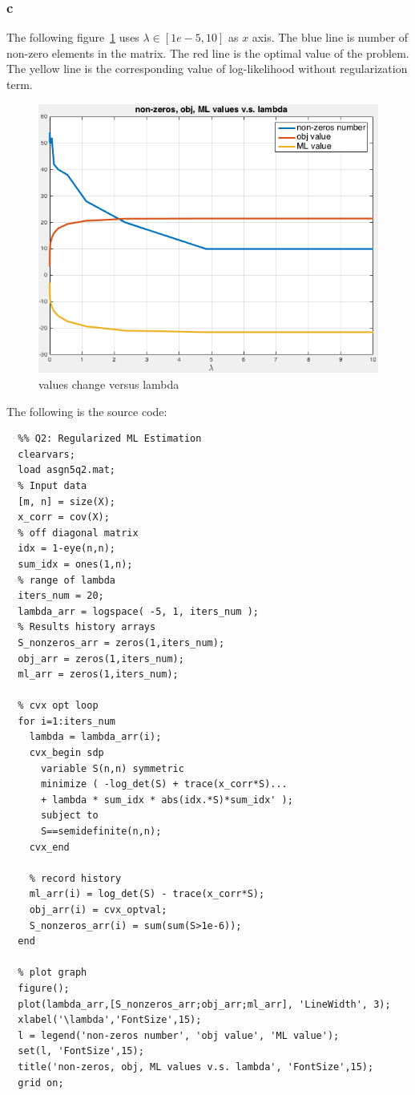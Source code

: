 \documentclass[10pt,a4paper]{article}
\begin{document}
\subsubsection{c}
The following figure~\ref{fig:q2vs} uses $\lambda\in [1e-5,10]$ as $x$
axis. The blue line is number of non-zero elements in the
matrix. The red line is the optimal value of the problem.
The yellow line is the corresponding value of log-likelihood
without regularization term.
\begin{figure}
  \centering
	\includegraphics[width=0.7\linewidth]{Q2_vslambda.png}
  \caption{values change versus lambda}
  \label{fig:q2vs}
\end{figure}

The following is the source code:

\begin{lstlisting}
  %% Q2: Regularized ML Estimation
  clearvars;
  load asgn5q2.mat;
  % Input data
  [m, n] = size(X);
  x_corr = cov(X);
  % off diagonal matrix
  idx = 1-eye(n,n);
  sum_idx = ones(1,n);
  % range of lambda
  iters_num = 20;
  lambda_arr = logspace( -5, 1, iters_num );
  % Results history arrays
  S_nonzeros_arr = zeros(1,iters_num);
  obj_arr = zeros(1,iters_num);
  ml_arr = zeros(1,iters_num);

  % cvx opt loop
  for i=1:iters_num
    lambda = lambda_arr(i);
    cvx_begin sdp
      variable S(n,n) symmetric 
      minimize ( -log_det(S) + trace(x_corr*S)...
      + lambda * sum_idx * abs(idx.*S)*sum_idx' );
      subject to
      S==semidefinite(n,n);
    cvx_end

    % record history
    ml_arr(i) = log_det(S) - trace(x_corr*S);
    obj_arr(i) = cvx_optval;
    S_nonzeros_arr(i) = sum(sum(S>1e-6));
  end

  % plot graph
  figure();
  plot(lambda_arr,[S_nonzeros_arr;obj_arr;ml_arr], 'LineWidth', 3);
  xlabel('\lambda','FontSize',15);
  l = legend('non-zeros number', 'obj value', 'ML value');
  set(l, 'FontSize',15);
  title('non-zeros, obj, ML values v.s. lambda', 'FontSize',15);
  grid on;
\end{lstlisting}
\end{document}
